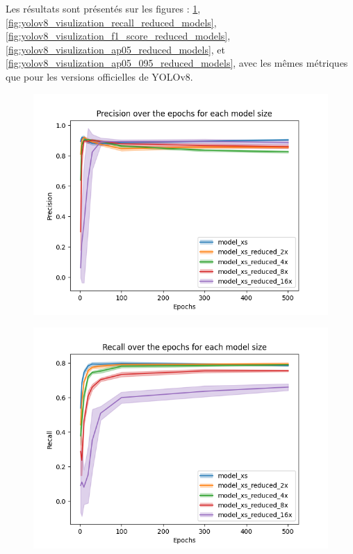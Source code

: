 Les résultats sont présentés sur les figures : \ref{fig:yolov8_visulization_precision_reduced_models}, \ref{fig:yolov8_visulization_recall_reduced_models}, \ref{fig:yolov8_visulization_f1_score_reduced_models}, \ref{fig:yolov8_visulization_ap05_reduced_models}, et \ref{fig:yolov8_visulization_ap05_095_reduced_models}, avec les mêmes métriques que pour les versions officielles de YOLOv8.

\begin{figure}[!htbp]
    \centering
    \begin{minipage}[t]{.5\textwidth}%
      \centering
      \includegraphics[width=1.1\linewidth]{Figures/results/yolov8/precision_over_epochs_reduced_models.png}
      \label{fig:yolov8_visulization_precision_reduced_models}
    \end{minipage}%
    \begin{minipage}[t]{.5\textwidth}%
      \centering
      \includegraphics[width=1.1\linewidth ]{Figures/results/yolov8/recall_over_epochs_reduced_models.png}

\end{minipage}
\end{figure}
